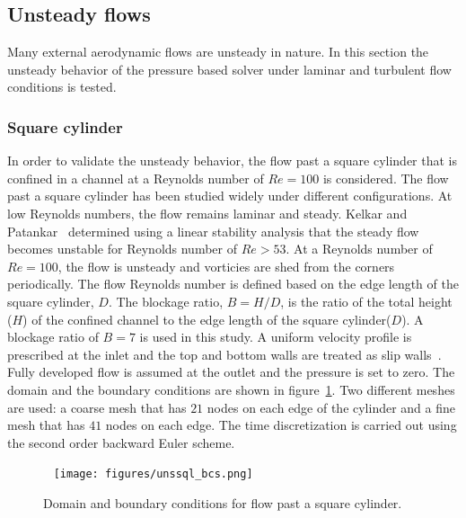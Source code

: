 \subsection{Unsteady flows}
Many external aerodynamic flows are unsteady in nature. In this section the unsteady behavior of the pressure based solver under laminar and turbulent flow conditions is tested.
\subsubsection{Square cylinder}
In order to validate the unsteady behavior, the flow past a square cylinder that is confined in a channel at a Reynolds number of $Re=100$ is considered. The flow past a square cylinder has been studied widely under different configurations. At low Reynolds numbers, the flow remains laminar and steady. Kelkar and Patankar~\cite{kelkar1992numerical} determined using a linear stability analysis that the steady flow becomes unstable for Reynolds number of $Re > 53$. At a Reynolds number of $Re=100$, the flow is unsteady and vorticies are shed from the corners periodically. The flow Reynolds number is defined based on the edge length of the square cylinder, $D$. The blockage ratio, $B=H/D$, is the ratio of the total height ($H$) of the confined channel to the edge length of the square cylinder($D$). A blockage ratio of $B=7$ is used in this study. A uniform velocity profile is prescribed at the inlet and the top and bottom walls are treated as slip walls~\cite{kelkar1992numerical}. Fully developed flow is assumed at the outlet and the pressure is set to zero. The domain and the boundary conditions are shown in figure~\ref{fig:sqcylbc}. Two different meshes are used: a coarse mesh that has $21$ nodes on each edge of the cylinder and a fine mesh that has $41$ nodes on each edge. The time discretization is carried out using the second order backward Euler scheme.
\begin{figure}[h!]
    \centering
    ~ %
    \centering
    \captionsetup{justification=centering}
        \texttt{[image: figures/unssql\_bcs.png]}
    \caption{Domain and boundary conditions for flow past a square cylinder.}
    \label{fig:sqcylbc}
\end{figure}

